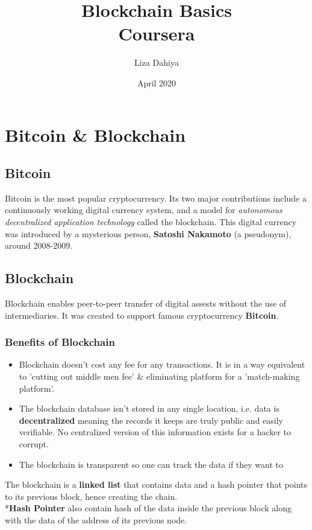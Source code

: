 \documentclass{article}
\title{Blockchain Basics\\Coursera}
\author{Liza Dahiya}
\date{April 2020}
\begin{document}
\maketitle
\tableofcontents
\setcounter{tocdepth}{1}

\section{Bitcoin \& Blockchain}
\subsection{Bitcoin}
Bitcoin is the most popular cryptocurrency. Its two major contributions include a continuously working digital currency system, and a model for \textit{autonomous decentralized application technology} called the blockchain. This digital currency was introduced by a mysterious person, \textbf{Satoshi Nakamoto} (a pseudonym), around 2008-2009. 

\subsection{Blockchain}
Blockchain enables peer-to-peer transfer of digital assests without the use of intermediaries. It was created to support famous cryptocurrency \textbf{Bitcoin}. 
\subsubsection{Benefits of Blockchain}
\begin{itemize}
    \item Blockchain doesn't cost any fee for any transactions. It is in a way equivalent to 'cutting out middle men fee' \& eliminating platform for a 'match-making platform'. 
    \item The blockchain database isn’t stored in any single location, i.e. data is \textbf{decentralized} meaning the records it keeps are truly public and easily verifiable. No centralized version of this information exists for a hacker to corrupt.
    \item The blockchain is transparent so one can track the data if they want to
\end{itemize}

The blockchain is a \textbf{linked list} that contains data and a hash pointer that points to its previous block, hence creating the chain.\\ 
*\textbf{Hash Pointer} also contain hash of the data inside the previous block along with the  data of the address of its previous node. 
\end{document}
